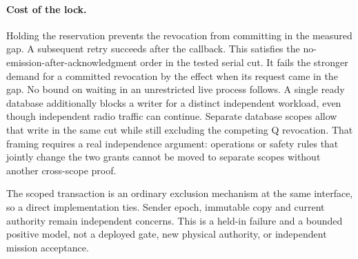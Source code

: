 \documentclass{article}
\begin{document}
\paragraph{Cost of the lock.}
Holding the reservation prevents the revocation from committing in
the measured gap. A subsequent retry succeeds after the callback.
This satisfies the no-emission-after-acknowledgment order in the
tested serial cut. It fails the stronger demand for a committed
revocation by the effect when its request came in the gap. No
bound on waiting in an unrestricted live process follows.
A single ready database additionally blocks a writer for a distinct
independent workload, even though independent radio traffic can
continue. Separate database scopes allow that write in the same cut
while still excluding the competing Q revocation. That framing requires
a real independence argument: operations or safety rules that jointly
change the two grants cannot be moved to separate scopes without
another cross-scope proof.

The scoped transaction is an ordinary exclusion mechanism at the same
interface, so a direct implementation ties. Sender epoch, immutable
copy and current authority remain independent concerns. This is a
held-in failure and a bounded positive model, not a deployed gate,
new physical authority, or independent mission acceptance.
\end{document}
